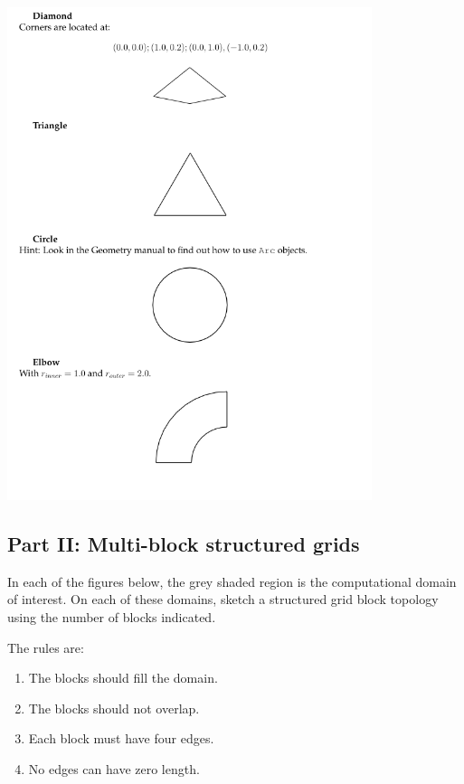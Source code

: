 \documentclass{article}
\begin{document}
\begin{center}
  \includegraphics[width=0.8\textwidth]{single-block-domains.png}
\end{center}

\newpage

\subsection*{Part II: Multi-block structured grids}

In each of the figures below, the grey shaded region is the computational domain
of interest.
On each of these domains, sketch a structured grid block topology using
the number of blocks indicated.

The rules are:
\begin{enumerate}
\item The blocks should fill the domain.
\item The blocks should not overlap.
\item Each block must have four edges.
\item No edges can have zero length.
\end{enumerate}
\end{document}
